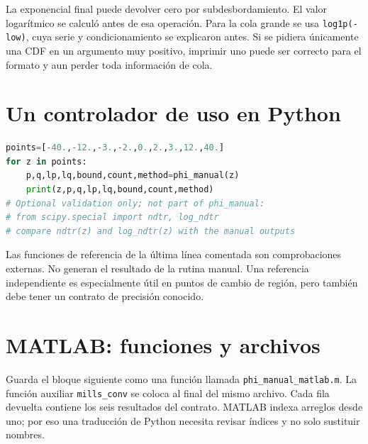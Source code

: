 \documentclass[11pt,a4paper]{article}
\theoremstyle{definition}
\begin{document}
La exponencial final puede devolver cero por subdesbordamiento. El valor logarítmico se calculó antes de esa operación. Para la cola grande se usa \texttt{log1p(-low)}, cuya serie y condicionamiento se explicaron antes. Si se pidiera únicamente una CDF en un argumento muy positivo, imprimir uno puede ser correcto para el formato y aun perder toda información de cola.

\section{Un controlador de uso en Python}
\begin{lstlisting}[language=Python]
points=[-40.,-12.,-3.,-2.,0.,2.,3.,12.,40.]
for z in points:
    p,q,lp,lq,bound,count,method=phi_manual(z)
    print(z,p,q,lp,lq,bound,count,method)
# Optional validation only; not part of phi_manual:
# from scipy.special import ndtr, log_ndtr
# compare ndtr(z) and log_ndtr(z) with the manual outputs
\end{lstlisting}
Las funciones de referencia de la última línea comentada son comprobaciones externas. No generan el resultado de la rutina manual. Una referencia independiente es especialmente útil en puntos de cambio de región, pero también debe tener un contrato de precisión conocido.

\section{MATLAB: funciones y archivos}
Guarda el bloque siguiente como una función llamada \texttt{phi\_manual\_matlab.m}. La función auxiliar \texttt{mills\_conv} se coloca al final del mismo archivo. Cada fila devuelta contiene los seis resultados del contrato. MATLAB indexa arreglos desde uno; por eso una traducción de Python necesita revisar índices y no solo sustituir nombres.
\end{document}
